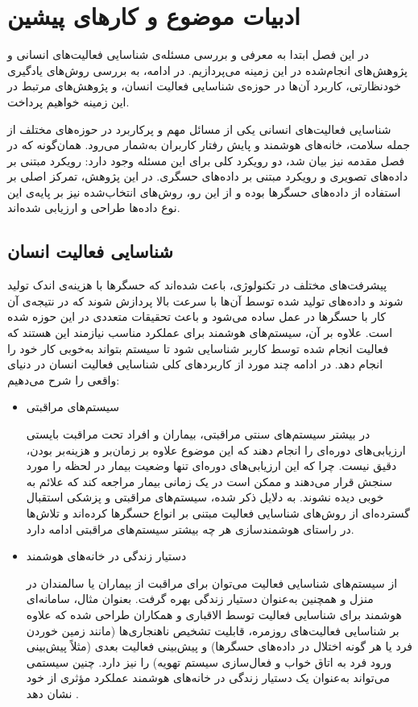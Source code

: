 \chapter{ادبیات موضوع و کارهای پیشین}

در این فصل ابتدا به معرفی و بررسی مسئله‌ی شناسایی فعالیت‌های انسانی و پژوهش‌های انجام‌شده در این زمینه می‌پردازیم. در ادامه، به بررسی روش‌های یادگیری خودنظارتی، کاربرد آن‌ها در حوزه‌ی شناسایی فعالیت انسان، و پژوهش‌های مرتبط در این زمینه خواهیم پرداخت.

شناسایی فعالیت‌های انسانی یکی از مسائل مهم و پرکاربرد در حوزه‌های مختلف از جمله سلامت، خانه‌های هوشمند و پایش رفتار کاربران به‌شمار می‌رود. همان‌گونه که در فصل مقدمه نیز بیان شد، دو رویکرد کلی برای این مسئله وجود دارد: رویکرد مبتنی بر داده‌های تصویری و رویکرد مبتنی بر داده‌های حسگری. در این پژوهش، تمرکز اصلی بر استفاده از داده‌های حسگرها بوده و از این رو، روش‌های انتخاب‌شده نیز بر پایه‌ی این نوع داده‌ها طراحی و ارزیابی شده‌اند.

\section{شناسایی فعالیت انسان}

پیشرفت‌های مختلف در تکنولوژی، باعث شده‌اند که حسگرها با هزینه‌ی اندک تولید شوند و داده‌های تولید شده توسط آن‌ها با سرعت بالا پردازش شوند که در نتیجه‌ی آن کار با حسگرها در عمل ساده می‌شود و باعث تحقیقات متعددی در این حوزه شده است. علاوه بر آن، سیستم‌های هوشمند برای عملکرد مناسب نیازمند این هستند که فعالیت انجام شده توسط کاربر شناسایی شود تا سیستم بتواند به‌خوبی کار خود را انجام دهد. در ادامه چند مورد از کاربردهای کلی شناسایی فعالیت انسان در دنیای واقعی را شرح می‌دهیم:

\begin{itemize}
\item{سیستم‌های مراقبتی}

در بیشتر سیستم‌های سنتی مراقبتی، بیماران و افراد تحت مراقبت بایستی ارزیابی‌های دوره‌ای را انجام دهند که این موضوع علاوه بر زمان‌بر و هزینه‌بر بودن، دقیق نیست. چرا که این ارزیابی‌های دوره‌ای تنها وضعیت بیمار در لحظه را مورد سنجش قرار می‌دهند و ممکن است در یک زمانی بیمار مراجعه کند که علائم به خوبی دیده نشوند. به دلایل ذکر شده، سیستم‌های مراقبتی و پزشکی استقبال گسترده‌ای از روش‌های شناسایی فعالیت مبتنی بر انواع حسگرها کرده‌اند و تلاش‌ها در راستای هوشمندسازی هر چه بیشتر سیستم‌های مراقبتی ادامه دارد.

\item{دستیار زندگی در خانه‌های هوشمند}

از سیستم‌های شناسایی فعالیت می‌توان برای مراقبت از بیماران یا سالمندان در منزل و همچنین به‌عنوان دستیار زندگی بهره گرفت. بعنوان مثال، سامانه‌ای هوشمند برای شناسایی فعالیت توسط الاقباری و همکاران طراحی شده که علاوه بر شناسایی فعالیت‌های روزمره، قابلیت تشخیص ناهنجاری‌ها (مانند زمین خوردن فرد یا هر گونه اختلال در داده‌های حسگرها) و پیش‌بینی فعالیت بعدی (مثلاً پیش‌بینی ورود فرد به اتاق خواب و فعال‌سازی سیستم تهویه) را نیز دارد. چنین سیستمی می‌تواند به‌عنوان یک دستیار زندگی در خانه‌های هوشمند عملکرد مؤثری از خود نشان دهد \cite{alaghbari2022activities}.
‪
\end{itemize}

